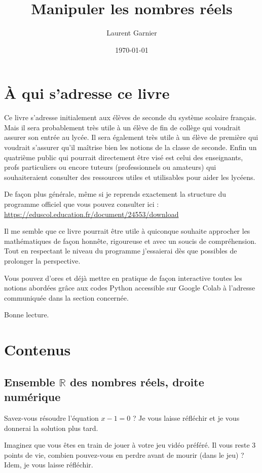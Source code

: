\documentclass[11pt]{article}
\author{Laurent Garnier}
\date{\today}
\title{Manipuler les nombres réels}
\begin{document}
\maketitle
\tableofcontents


\section{À qui s'adresse ce livre}
\label{sec:org835d39c}

Ce livre s'adresse initialement aux élèves de seconde du système
scolaire français. Mais il sera probablement très utile à un élève
de fin de collège qui voudrait assurer son entrée au lycée. Il sera
également très utile à un élève de première qui voudrait s'assurer
qu'il maîtrise bien les notions de la classe de seconde. Enfin un
quatrième public qui pourrait directement être visé est celui des
enseignants, profs particuliers ou encore tuteurs (professionnels ou
amateurs) qui souhaiteraient consulter des ressources utiles et
utilisables pour aider les lycéens.

De façon plus générale, même si je reprends exactement la structure
du programme officiel que vous pouvez consulter ici :
\url{https://eduscol.education.fr/document/24553/download}

Il me semble que ce livre pourrait être utile à quiconque souhaite
approcher les mathématiques de façon honnête, rigoureuse et avec un
soucis de compréhension. Tout en respectant le niveau du programme
j'essaierai dès que possibles de prolonger la perspective.

Vous pouvez d'ores et déjà mettre en pratique de façon interactive
toutes les notions abordées grâce aux codes Python accessible sur
Google Colab à l'adresse communiquée dans la section concernée.

Bonne lecture.

\section{Contenus}
\label{sec:org98ac306}
\subsection{Ensemble \(\mathbb{R}\) des nombres réels, droite numérique}
\label{sec:org0c17de3}

Savez-vous résoudre l'équation \(x - 1 = 0\) ? Je vous laisse
réfléchir et je vous donnerai la solution plus tard.

Imaginez que vous êtes en train de jouer à votre jeu vidéo
préféré. Il vous reste 3 points de vie, combien pouvez-vous en
perdre avant de mourir (dans le jeu) ? Idem, je vous laisse
réfléchir.
\end{document}
